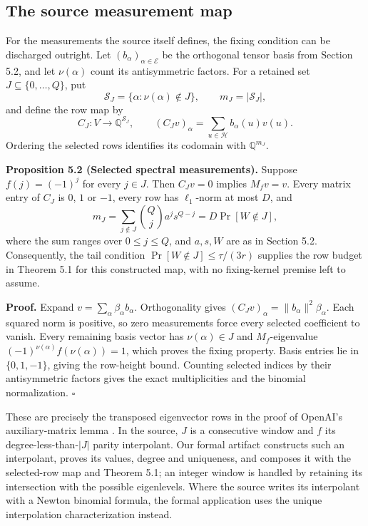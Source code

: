 \documentclass[11pt,letterpaper]{article}
\newenvironment{manualstatement}{%
  \par\addvspace{0.7\baselineskip}\begingroup\itshape\noindent\ignorespaces
}{\par\endgroup\addvspace{0.4\baselineskip}}
\newenvironment{manualproof}{%
  \par\addvspace{0.4\baselineskip}\begingroup\normalfont\noindent\ignorespaces
}{\par\endgroup\addvspace{0.5\baselineskip}}
\begin{document}
\subsection{The source measurement
map}\label{the-source-measurement-map}

For the measurements the source itself defines, the fixing condition can
be discharged outright. Let \((b_\alpha)_{\alpha\in\mathcal E}\) be the
orthogonal tensor basis from Section 5.2, and let \(\nu(\alpha)\) count
its antisymmetric factors. For a retained set
\(J\subseteq\{0,\ldots,Q\}\), put
\[\mathcal S_J=\{\alpha:\nu(\alpha)\notin J\},
\qquad m_J=|\mathcal S_J|,\] and define the row map by
\[C_J:V\longrightarrow\mathbb Q^{\mathcal S_J},
\qquad (C_Jv)_\alpha=\sum_{u\in\mathcal H}b_\alpha(u)v(u).\] Ordering
the selected rows identifies its codomain with \(\mathbb Q^{m_J}\).

\begin{manualstatement}

{{\upshape \textbf{Proposition 5.2 (Selected spectral measurements).}}}
Suppose \(f(j)=(-1)^j\) for every \(j\in J\). Then \(C_Jv=0\) implies
\(M_fv=v\). Every matrix entry of \(C_J\) is \(0\), \(1\) or \(-1\),
every row has \(\ell_1\)-norm at most \(D\), and
\[m_J=\sum_{j\notin J}\binom Qj a^j s^{Q-j}
    =D\Pr[W\notin J],\] where the sum ranges over \(0\le j\le Q\), and
\(a,s,W\) are as in Section 5.2. Consequently, the tail condition
\(\Pr[W\notin J]\le\tau/(3r)\) supplies the row budget in Theorem 5.1
for this constructed map, with no fixing-kernel premise left to assume.

\end{manualstatement}

\begin{manualproof}

\textbf{Proof.} Expand \(v=\sum_\alpha\beta_\alpha b_\alpha\).
Orthogonality gives \((C_Jv)_\alpha=\|b_\alpha\|^2\beta_\alpha\). Each
squared norm is positive, so zero measurements force every selected
coefficient to vanish. Every remaining basis vector has
\(\nu(\alpha)\in J\) and \(M_f\)-eigenvalue
\((-1)^{\nu(\alpha)}f(\nu(\alpha))=1\), which proves the fixing
property. Basis entries lie in \(\{0,1,-1\}\), giving the row-height
bound. Counting selected indices by their antisymmetric factors gives
the exact multiplicities and the binomial normalization. \(\square\)

\end{manualproof}

These are precisely the transposed eigenvector rows in the proof of
OpenAI's auxiliary-matrix lemma \citep[Lemma
\texttt{lem:swaps-matrix}]{O26}. In the source, \(J\) is a consecutive
window and \(f\) its degree-less-than-\(|J|\) parity interpolant. Our
formal artifact constructs such an interpolant, proves its values,
degree and uniqueness, and composes it with the selected-row map and
Theorem 5.1; an integer window is handled by retaining its intersection
with the possible eigenlevels. Where the source writes its interpolant
with a Newton binomial formula, the formal application uses the unique
interpolation characterization instead.
\end{document}
